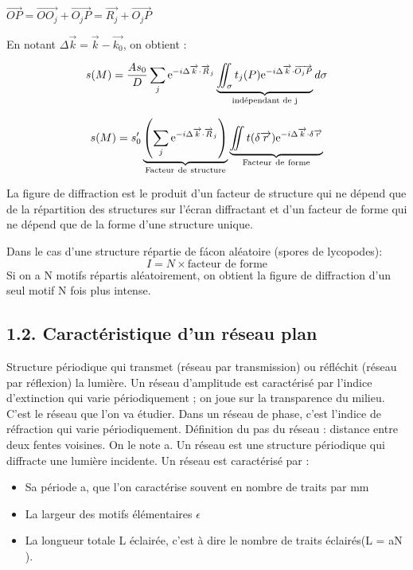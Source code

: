 \documentclass[french, a4paper, 10pt, twocolumn, landscape]{article}
\begin{document}
$\vec{OP}=\vec{OO_j}+{\vec{O_jP}}=\vec{R_j}+\vec{O_jP}$

En notant $\Delta \vec{k} = \vec{k}-\vec{k_0}$, on obtient : 

\begin{equation}
    s(M) = \dfrac{As_0}{D}\sum_j{\rm e}^{-i\Delta\vec{k}\cdot \vec{R}_j}\underbrace{\iint_\sigma t_j(P){\rm e}^{-i\Delta \vec{k}\cdot \vec{O_jP}}}_{\text{indépendant de j}}d\sigma
\end{equation}

\begin{equation}
    s(M) = s_0^\prime\underbrace{\left(\sum_j{\rm e}^{-i\Delta\vec{k}\cdot\vec{R}_j}\right)}_{\rm Facteur~de~structure}\underbrace{\iint t(\delta\vec{r}){\rm e}^{-i\Delta \vec{k}\cdot\delta\vec{r}}}_{\rm Facteur~de~forme}
\end{equation}

La figure de diffraction est le produit d'un facteur de structure qui ne dépend que de la répartition des structures sur l'écran diffractant et d'un facteur de forme qui ne dépend que de la forme d'une structure unique.

Dans le cas d'une structure répartie de fácon aléatoire (spores de lycopodes): 
$$I = N\times \text{facteur de forme}$$ Si on a N motifs répartis aléatoirement, on obtient la figure de diffraction d'un seul motif N fois plus intense.

\subsection*{1.2. Caractéristique d'un réseau plan}

Structure périodique qui transmet (réseau par
transmission) ou réfléchit (réseau par réflexion) la lumière.
Un réseau d'amplitude est caractérisé par l'indice d'extinction qui varie
périodiquement ; on joue sur la transparence du milieu. C'est le réseau que
l'on va étudier. Dans un réseau de phase, c'est l'indice de réfraction qui
varie périodiquement.
Définition du pas du réseau : distance entre deux fentes voisines. On le
note a. Un réseau est une structure périodique qui diffracte une lumière incidente. Un réseau est caractérisé par :
\begin{itemize}

\item Sa période a, que l'on caractérise souvent en nombre de traits par mm
\item La largeur des motifs élémentaires $\epsilon$
\item La longueur totale L éclairée, c'est à dire le nombre de traits éclairés(L = aN ).
\end{itemize}
\end{document}
